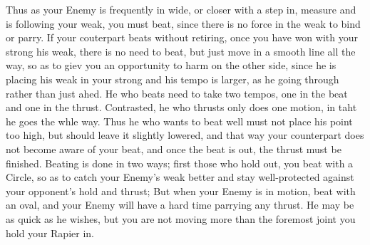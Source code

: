 
Thus as your Enemy is frequently in wide, or closer with a step in,
measure and is following your weak, you must beat, since there is no
force in the weak to bind or parry. If your couterpart beats without
retiring, once you have won with your strong his weak, there is no
need to beat, but just move in a smooth line all the way, so as to
giev you an opportunity to harm on the other side, since he is placing
his weak in your strong and his tempo is larger, as he going through
rather than just ahed. He who beats need to take two tempos, one in
the beat and one in the thrust. Contrasted, he who thrusts only does
one motion, in taht he goes the whle way. Thus he who wants to beat
well must not place his point too high, but should leave it slightly
lowered, and that way your counterpart does not become aware of your
beat, and once the beat is out, the thrust must be finished. Beating
is done in two ways; first those who hold out, you beat with a Circle,
so as to catch your Enemy's weak better and stay well-protected
against your opponent's hold and thrust; But when your Enemy is in
motion, beat with an oval, and your Enemy will have a hard time
parrying any thrust. He may be as quick as he wishes, but you are not
moving more than the foremost joint you hold your Rapier in.

